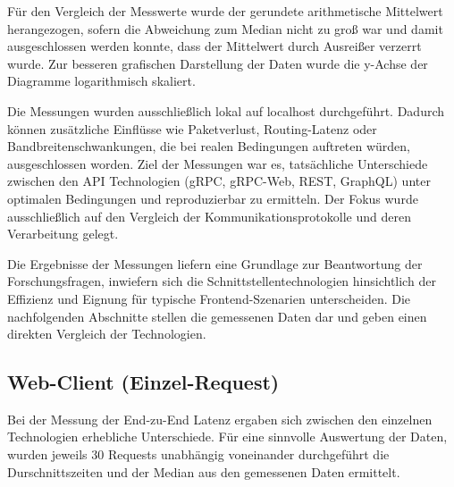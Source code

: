 Für den Vergleich der Messwerte wurde der gerundete arithmetische Mittelwert herangezogen, sofern die Abweichung zum Median nicht zu groß war und damit ausgeschlossen werden konnte, dass der Mittelwert durch Ausreißer verzerrt wurde. Zur besseren grafischen Darstellung der Daten wurde die y-Achse der Diagramme logarithmisch skaliert.

Die Messungen wurden ausschließlich lokal auf localhost durchgeführt. Dadurch können zusätzliche Einflüsse wie Paketverlust, Routing-Latenz oder Bandbreitenschwankungen, die bei realen Bedingungen auftreten würden, ausgeschlossen worden. Ziel der Messungen war es, tatsächliche Unterschiede zwischen den API Technologien (gRPC, gRPC-Web, REST, GraphQL) unter optimalen Bedingungen und reproduzierbar zu ermitteln.
Der Fokus wurde ausschließlich auf den Vergleich der Kommunikationsprotokolle und deren Verarbeitung gelegt.

Die Ergebnisse der Messungen liefern eine Grundlage zur Beantwortung der Forschungsfragen, inwiefern sich die Schnittstellentechnologien hinsichtlich der Effizienz und Eignung für typische Frontend-Szenarien unterscheiden.  
Die nachfolgenden Abschnitte stellen die gemessenen Daten dar und geben einen direkten Vergleich der Technologien.

\clearpage
\subsection{Web-Client (Einzel-Request)}

Bei der Messung der End-zu-End Latenz ergaben sich zwischen den einzelnen Technologien erhebliche Unterschiede. 
Für eine sinnvolle Auswertung der Daten, wurden jeweils 30 Requests unabhängig voneinander durchgeführt die Durschnittszeiten und der Median aus den gemessenen Daten ermittelt. 

